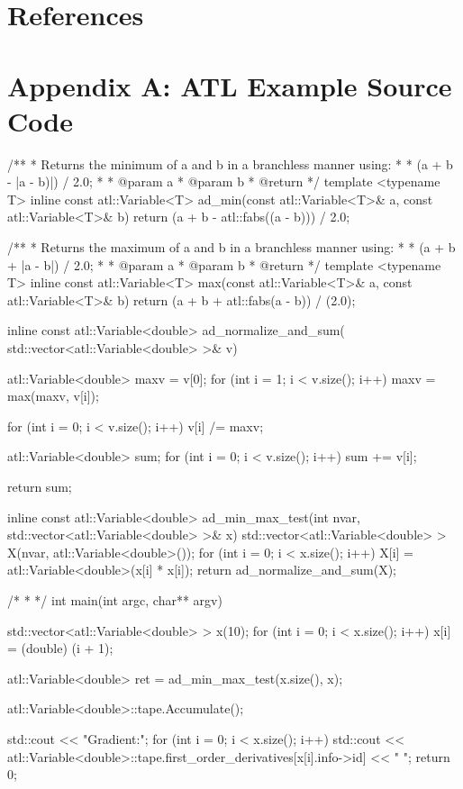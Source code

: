 \documentclass[oneside]{article}
\begin{document}
\section{References}

\section{Appendix A: ATL Example Source Code}

\begin{cppsource}

/**
 * Returns the minimum of a and b in a branchless manner using:
 *
 * (a + b - |a - b)|) / 2.0;
 *
 * @param a
 * @param b
 * @return
 */
template <typename T>
inline const atl::Variable<T> ad_min(const atl::Variable<T>& a,
const atl::Variable<T>& b) {
    return (a + b - atl::fabs((a - b))) / 2.0;
}

/**
 * Returns the maximum of a and b in a branchless manner using:
 *
 * (a + b + |a - b|) / 2.0;
 *
 * @param a
 * @param b
 * @return
 */
template <typename T>
inline const atl::Variable<T> max(const atl::Variable<T>& a,
 const atl::Variable<T>& b) {
    return (a + b + atl::fabs(a - b)) / (2.0);
}


inline const atl::Variable<double> ad_normalize_and_sum(
std::vector<atl::Variable<double> >& v) {
    atl::Variable<double> maxv = v[0];
    for (int i = 1; i < v.size(); i++) {
        maxv = max(maxv, v[i]);
    }

    for (int i = 0; i < v.size(); i++) {
        v[i] /= maxv;
    }

    atl::Variable<double> sum;
    for (int i = 0; i < v.size(); i++) {
        sum += v[i];
    }

    return sum;
}
\end{cppsource}

\begin{cppsource}

inline const atl::Variable<double> ad_min_max_test(int nvar,
std::vector<atl::Variable<double> >& x) {
    std::vector<atl::Variable<double> > X(nvar, atl::Variable<double>());
    for (int i = 0; i < x.size(); i++) {
        X[i] = atl::Variable<double>(x[i] * x[i]);
    }
    return ad_normalize_and_sum(X);
}

/*
 *
 */
int main(int argc, char** argv) {

    std::vector<atl::Variable<double> > x(10);
    for (int i = 0; i < x.size(); i++) {
        x[i] = (double) (i + 1);
    }

    atl::Variable<double> ret = ad_min_max_test(x.size(), x);

    atl::Variable<double>::tape.Accumulate();

    std::cout << "Gradient:\n";
    for (int i = 0; i < x.size(); i++) {
        std::cout <<
        atl::Variable<double>::tape.first_order_derivatives[x[i].info->id] << " ";
    }
    return 0;
}

\end{cppsource}
\end{document}
